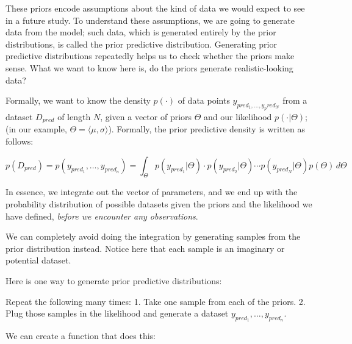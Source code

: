 \documentclass[12pt,]{krantz}
\theoremstyle{definition}
\theoremstyle{definition}
\theoremstyle{definition}
\theoremstyle{remark}
\begin{document}
These priors encode assumptions about the kind of data we would expect to see in a future study.
To understand these assumptions, we are going to generate data from the model; such data, which is generated entirely by the prior distributions, is called the prior predictive distribution. Generating prior predictive distributions repeatedly helps us to check whether the priors make sense. What we want to know here is, do the priors generate realistic-looking data?

Formally, we want to know the density \(p(\cdot)\) of data points \(y_{pred_1,\dots,y_pred_N}\) from a dataset \(D_{pred}\) of length \(N\), given a vector of priors \(\Theta\) and our likelihood \(p(\cdot|\Theta)\); (in our example, \(\Theta=\langle\mu,\sigma \rangle\)). Formally, the prior predictive density is written as follows:

\begin{equation}
p(D_{pred}) = p(y_{pred_1},\dots,y_{pred_n})= \int_\Theta p(y_{pred_1}|\Theta)\cdot p(y_{pred_2}|\Theta)\cdots p(y_{pred_N}|\Theta) p(\Theta) \, d\Theta 
\end{equation}

In essence, we integrate out the vector of parameters, and we end up with the probability distribution of possible datasets given the priors and the likelihood we have defined, \emph{before we encounter any observations}.

We can completely avoid doing the integration by generating samples from the prior distribution instead. Notice here that each sample is an imaginary or potential dataset.

Here is one way to generate prior predictive distributions:

Repeat the following many times:
1. Take one sample from each of the priors.
2. Plug those samples in the likelihood and generate a dataset \(y_{pred_1},\ldots,y_{pred_n}\).

We can create a function that does this:
\end{document}
